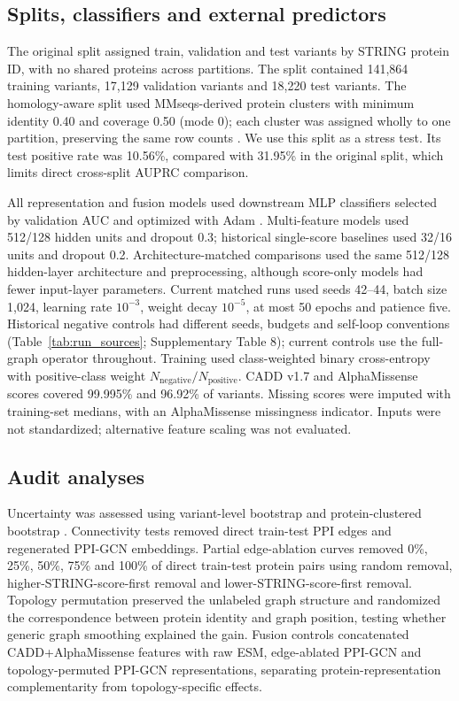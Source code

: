 \documentclass[conference]{IEEEtran}
\newcommand{\CADDAM}{CADD\allowbreak{}+\allowbreak{}AlphaMissense}
\begin{document}
\subsection{Splits, classifiers and external predictors}

The original split assigned train, validation and test variants by STRING protein ID, with no shared proteins across partitions. The split contained 141,864 training variants, 17,129 validation variants and 18,220 test variants. The homology-aware split used MMseqs-derived protein clusters with minimum identity 0.40 and coverage 0.50 (mode 0); each cluster was assigned wholly to one partition, preserving the same row counts \cite{Steinegger2017MMseqs2}. We use this split as a stress test. Its test positive rate was 10.56\%, compared with 31.95\% in the original split, which limits direct cross-split AUPRC comparison.

All representation and fusion models used downstream MLP classifiers selected by validation AUC and optimized with Adam \cite{Kingma2015Adam}. Multi-feature models used 512/128 hidden units and dropout 0.3; historical single-score baselines used 32/16 units and dropout 0.2. Architecture-matched comparisons used the same 512/128 hidden-layer architecture and preprocessing, although score-only models had fewer input-layer parameters. Current matched runs used seeds 42--44, batch size 1,024, learning rate $10^{-3}$, weight decay $10^{-5}$, at most 50 epochs and patience five. Historical negative controls had different seeds, budgets and self-loop conventions (Table~\ref{tab:run_sources}; Supplementary Table 8); current controls use the full-graph operator throughout. Training used class-weighted binary cross-entropy with positive-class weight $N_{\mathrm{negative}}/N_{\mathrm{positive}}$. CADD v1.7 and AlphaMissense scores \cite{Kircher2014CADD,Schubach2024CADDv17,Cheng2023AlphaMissense} covered 99.995\% and 96.92\% of variants. Missing scores were imputed with training-set medians, with an AlphaMissense missingness indicator. Inputs were not standardized; alternative feature scaling was not evaluated.

\subsection{Audit analyses}

Uncertainty was assessed using variant-level bootstrap and protein-clustered bootstrap \cite{Efron1993Bootstrap}. Connectivity tests removed direct train-test PPI edges and regenerated PPI-GCN embeddings. Partial edge-ablation curves removed 0\%, 25\%, 50\%, 75\% and 100\% of direct train-test protein pairs using random removal, higher-STRING-score-first removal and lower-STRING-score-first removal. Topology permutation preserved the unlabeled graph structure and randomized the correspondence between protein identity and graph position, testing whether generic graph smoothing explained the gain. Fusion controls concatenated \CADDAM{} features with raw ESM, edge-ablated PPI-GCN and topology-permuted PPI-GCN representations, separating protein-representation complementarity from topology-specific effects.
\end{document}
